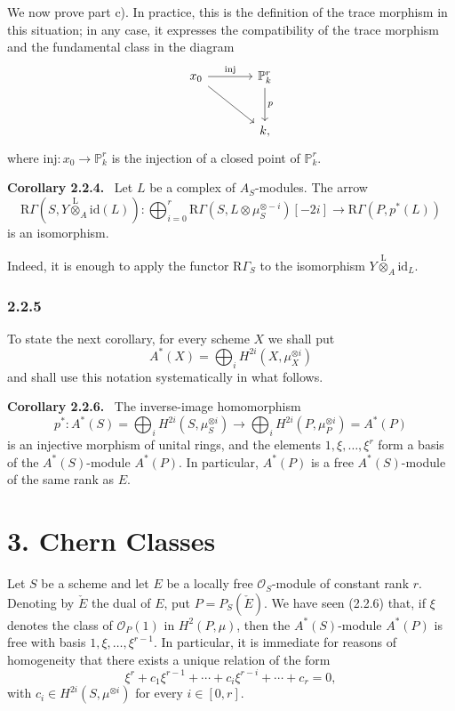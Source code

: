 \documentclass[11pt]{article}
\newenvironment{statement}[1]{\par\medskip\noindent\textbf{#1.}\ }{\par\medskip}
\providecommand{\lten}{\overset{\mathrm L}{\otimes}}
\providecommand{\lten}{\overset{\mathrm L}{\otimes}}
\providecommand{\lten}{\overset{\mathrm L}{\otimes}}
\providecommand{\lten}{\overset{\mathrm L}{\otimes}}
\providecommand{\lten}{\overset{\mathrm L}{\otimes}}
\begin{document}
We now prove part c). In practice, this is the definition of the trace morphism in this situation; in any case, it expresses the compatibility of the trace morphism and the fundamental class in the diagram
\[
\begin{tikzcd}[column sep=large,row sep=large]
x_0 \arrow[r,"\mathrm{inj}"] \arrow[dr] & \mathbb P^r_k \arrow[d,"p"]\\
& k ,
\end{tikzcd}
\]
where $\mathrm{inj}:x_0\to \mathbb P^r_k$ is the injection of a closed point of $\mathbb P^r_k$.

\begin{statement}{Corollary 2.2.4}
Let $L$ be a complex of $A_S$-modules. The arrow
\[
\mathrm R\Gamma(S,Y\lten_A\mathrm{id}(L)):
\bigoplus_{i=0}^r \mathrm R\Gamma(S,L\otimes\mu_S^{\otimes -i})[-2i]
\longrightarrow
\mathrm R\Gamma(P,p^*(L))
\]
is an isomorphism.
\end{statement}

Indeed, it is enough to apply the functor $\mathrm R\Gamma_S$ to the isomorphism $Y\lten_A\mathrm{id}_L$.

\subsubsection*{2.2.5}
To state the next corollary, for every scheme $X$ we shall put
\[
A^*(X)=\bigoplus_i H^{2i}(X,\mu_X^{\otimes i})
\]
and shall use this notation systematically in what follows.

\begin{statement}{Corollary 2.2.6}
The inverse-image homomorphism
\[
p^*:A^*(S)=\bigoplus_i H^{2i}(S,\mu_S^{\otimes i})
\longrightarrow
\bigoplus_i H^{2i}(P,\mu_P^{\otimes i})=A^*(P)
\]
is an injective morphism of unital rings, and the elements $1,\xi,\ldots,\xi^r$ form a basis of the $A^*(S)$-module $A^*(P)$. In particular, $A^*(P)$ is a free $A^*(S)$-module of the same rank as $E$.
\end{statement}

\section*{3. Chern Classes}

Let $S$ be a scheme and let $E$ be a locally free $\mathcal O_S$-module of constant rank $r$. Denoting by $\check E$ the dual of $E$, put $P=P_S(\check E)$. We have seen (2.2.6) that, if $\xi$ denotes the class of $\mathcal O_P(1)$ in $H^2(P,\mu)$, then the $A^*(S)$-module $A^*(P)$ is free with basis $1,\xi,\ldots,\xi^{r-1}$. In particular, it is immediate for reasons of homogeneity that there exists a unique relation of the form
\[
\xi^r+c_1\xi^{r-1}+\cdots+c_i\xi^{r-i}+\cdots+c_r=0,
\tag{3.1}
\]
with $c_i\in H^{2i}(S,\mu^{\otimes i})$ for every $i\in[0,r]$.
\end{document}
